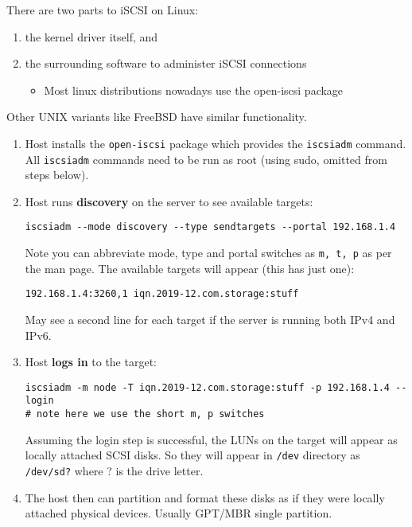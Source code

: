 \documentclass[slides]{pgnotes}
\begin{document}
There are two parts to iSCSI on Linux:
\begin{enumerate}
\item  the kernel driver itself, and
\item the surrounding software to administer iSCSI connections
  \begin{itemize}
  \item Most linux distributions nowadays use the open-iscsi package
  \end{itemize}
\end{enumerate}
Other UNIX variants like FreeBSD have similar functionality.


\begin{enumerate}
  \newpage
\item
  Host installs the \texttt{open-iscsi} package which provides the
  \texttt{iscsiadm} command. All \texttt{iscsiadm} commands need to be
  run as root (using sudo, omitted from steps below).
\item
  Host runs \textbf{discovery} on the server to see available targets:

\begin{verbatim}
iscsiadm --mode discovery --type sendtargets --portal 192.168.1.4
\end{verbatim}

  Note you can abbreviate mode, type and portal switches as
  \texttt{m,\ t,\ p} as per the man page. The available targets will
  appear (this has just one):

\begin{verbatim}
192.168.1.4:3260,1 iqn.2019-12.com.storage:stuff
\end{verbatim}

  May see a second line for each target if the server is running both
  IPv4 and IPv6.

  \newpage
\item
  Host \textbf{logs in} to the target:

\begin{verbatim}
iscsiadm -m node -T iqn.2019-12.com.storage:stuff -p 192.168.1.4 --login
# note here we use the short m, p switches
\end{verbatim}

  Assuming the login step is successful, the LUNs on the target will
  appear as locally attached SCSI disks. So they will appear in
  \texttt{/dev} directory as \texttt{/dev/sd?} where ? is the drive
  letter.

\item
  The host then can partition and format these disks as if they were
  locally attached physical devices. Usually GPT/MBR single partition.


\end{enumerate}
\end{document}
